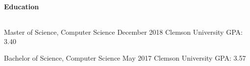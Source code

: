 \documentclass{article}
\begin{document}
  \setlength{\parskip}{0.0in}
  \paragraph{Education} $ $
  \setlength{\parskip}{0.1in}

  \hangindent=0.8in
  Master of Science, Computer Science \hfill December 2018 \newline
  Clemson University \newline
  GPA: 3.40

  \hangindent=0.8in
  Bachelor of Science, Computer Science \hfill May 2017 \newline
  Clemson University \newline
  GPA: 3.57
\end{document}
